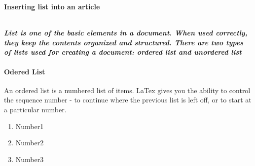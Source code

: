 \documentclass{article}
\begin{document}
	\noindent\begin{Huge}{\textbf{Inserting list into an article}}\end{Huge}\\
	
	
	\noindent\textbf{\textit{List is one of the basic elements in a document. When used correctly,
			they keep the contents organized and structured. There are two types
			of lists used for creating a document: ordered list and unordered list}}
	\paragraph{Odered List}
	An ordered list is a numbered list of items. LaTex gives you
	the ability to control the sequence number - to continue where the previous list
	is left off, or to start at a particular number.
	

	\begin{enumerate}
		\item Number1
		\item Number2
		\item Number3
	\end{enumerate}
\end{document}
